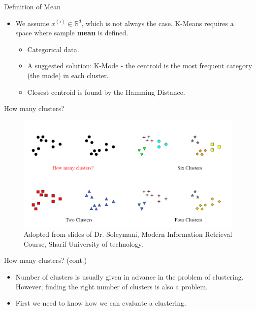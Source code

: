 \documentclass[serif, aspectratio=169]{beamer}
\begin{document}
\begin{frame}{Definition of Mean}
    \begin{itemize}
        \item We assume $x^{(i)} \in \mathbb{R}^d$, which is not always the case. K-Means requires a space where sample \textbf{mean} is defined.
        \begin{itemize}
            \item Categorical data. 
            \item  A suggested solution: K-Mode - the centroid is the most frequent category (the mode) in each cluster.
            \item Closest centroid is found by the Hamming Distance.
        \end{itemize}


    \end{itemize}
\end{frame}

\begin{frame}{How many clusters?}
    \begin{figure}
        \centering
        \includegraphics[scale=0.5]{pic/how_many_clusters.png}
        {\scriptsize Adopted from slides of Dr. Soleymani, Modern Information Retrieval Course, Sharif University of technology.}
    \end{figure}
\end{frame}


\begin{frame}{How many clusters? (cont.)}
    \begin{itemize}
        \item Number of clusters is usually given in advance in the problem of clustering. However; finding the right number of clusters is also a problem.
        \item First we need to know how we can evaluate a clustering.
    \end{itemize}
\end{frame}
\end{document}
